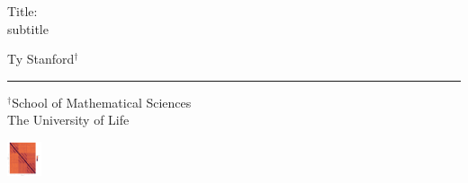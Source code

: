 \documentclass{beamer}
\begin{document}
 





\begin{frame}

\vspace{1.5cm}


\begin{center}
	\textcolor{lightmaroon1}{ \LARGE Title:} \\
	\textcolor{midgrey1}{ subtitle} \\
\end{center}

\begin{flushleft}
\vspace{1cm}
{\footnotesize
Ty Stanford$^{\dagger}$ 
}


\end{flushleft} 

\vspace{0.5cm}
\centering {\tiny \today}

\vspace{0.5cm}
\hrule




\begin{flushleft}
{\scriptsize $^{\dagger}$School of Mathematical Sciences} \\ \vspace{-0.15cm}
\hspace{0.05cm}
{\scriptsize The University of Life}
\end{flushleft} 


\vspace{-1.45cm} 
\begin{flushright} 
\hspace{4.7cm}
	\includegraphics[width=0.075\textwidth,height=0.075\textheight]{fig/corr.pdf}
\end{flushright}



\end{frame}
\end{document}

